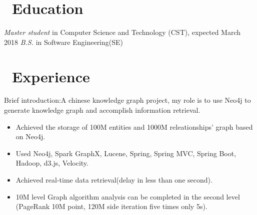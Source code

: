 \documentclass{resume}
\begin{document}



\section{\faGraduationCap\ Education}
\textit{Master student} in Computer Science and Technology (CST), expected March 2018
\textit{B.S.} in Software Engineering(SE)

\section{\faUsers\ Experience}
Brief introduction:A chinese knowledge graph project, my role is to use Neo4j to generate knowledge graph and accomplish information retrieval.
\begin{itemize}
  \item Achieved the storage of 100M entities and 1000M releationships' graph based on Neo4j.
  \item Used Neo4j, Spark GraphX, Lucene, Spring, Spring MVC, Spring Boot, Hadoop, d3.js, Velocity.
  \item Achieved real-time data retrieval(delay in less than one second).
  \item 10M level Graph algorithm analysis can be completed in the second level (PageRank 10M point, 120M side iteration five times only 5s).
\end{itemize}
\end{document}
